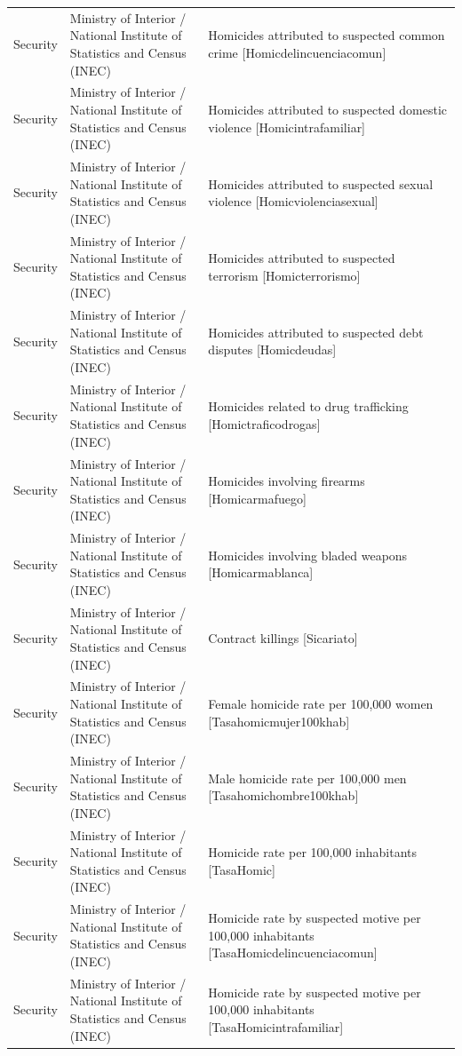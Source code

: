 \documentclass[10pt,a4paper]{article}
\begin{document}
\begin{longtable}{@{}>{\raggedright\arraybackslash}p{3.5cm}>{\raggedright\arraybackslash}p{5.6cm}>{\raggedright\arraybackslash}p{\dimexpr\textwidth-9.1cm-4\tabcolsep\relax}@{}}
Security & Ministry of Interior / National Institute of Statistics and Census (INEC) & Homicides attributed to suspected common crime [Homicdelincuenciacomun]\\
Security & Ministry of Interior / National Institute of Statistics and Census (INEC) & Homicides attributed to suspected domestic violence [Homicintrafamiliar]\\
Security & Ministry of Interior / National Institute of Statistics and Census (INEC) & Homicides attributed to suspected sexual violence [Homicviolenciasexual]\\
Security & Ministry of Interior / National Institute of Statistics and Census (INEC) & Homicides attributed to suspected terrorism [Homicterrorismo]\\
Security & Ministry of Interior / National Institute of Statistics and Census (INEC) & Homicides attributed to suspected debt disputes [Homicdeudas]\\
Security & Ministry of Interior / National Institute of Statistics and Census (INEC) & Homicides related to drug trafficking [Homictraficodrogas]\\
Security & Ministry of Interior / National Institute of Statistics and Census (INEC) & Homicides involving firearms [Homicarmafuego]\\
Security & Ministry of Interior / National Institute of Statistics and Census (INEC) & Homicides involving bladed weapons [Homicarmablanca]\\
Security & Ministry of Interior / National Institute of Statistics and Census (INEC) & Contract killings [Sicariato]\\
Security & Ministry of Interior / National Institute of Statistics and Census (INEC) & Female homicide rate per 100,000 women [Tasahomicmujer100khab]\\
Security & Ministry of Interior / National Institute of Statistics and Census (INEC) & Male homicide rate per 100,000 men [Tasahomichombre100khab]\\
Security & Ministry of Interior / National Institute of Statistics and Census (INEC) & Homicide rate per 100,000 inhabitants [TasaHomic]\\
Security & Ministry of Interior / National Institute of Statistics and Census (INEC) & Homicide rate by suspected motive per 100,000 inhabitants [TasaHomicdelincuenciacomun]\\
Security & Ministry of Interior / National Institute of Statistics and Census (INEC) & Homicide rate by suspected motive per 100,000 inhabitants [TasaHomicintrafamiliar]\\

\end{longtable}
\end{document}
